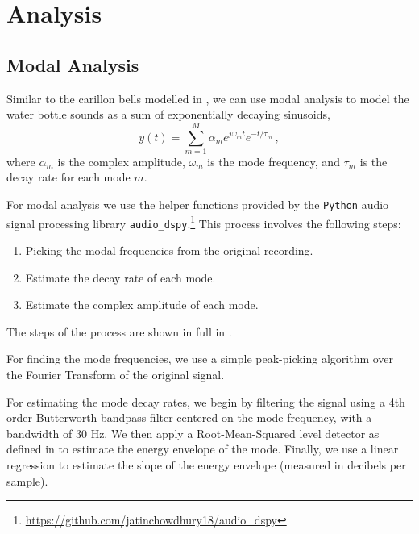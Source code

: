 \documentclass[twoside,a4paper]{article}
\begin{document}
%
%



\section{Analysis} \label{sec:analysis}


\subsection{Modal Analysis} \label{sec:modal-analysis}
%
Similar to the carillon bells modelled in \cite{canfielddafilou:werner:bellEffects:2017,rau:das:canfielddafilou:carillon:2019},
we can use modal analysis to model the water bottle sounds as
a sum of exponentially decaying sinusoids,
\begin{equation}
    y(t) = \sum_{m=1}^M \alpha_m e^{j\omega_m t} e^{-t/\tau_m} \,,
    \label{eq:modal-def}
\end{equation}
%
where $\alpha_m$ is the complex amplitude, $\omega_m$ is the mode
frequency, and $\tau_m$ is the decay rate for each mode $m$.

For modal analysis we use the helper functions
provided by the \texttt{Python} audio signal processing library
\texttt{audio\_dspy}.\footnote{\url{https://github.com/jatinchowdhury18/audio_dspy}}
This process involves the following steps:
\begin{enumerate}
    \item Picking the modal frequencies from the original recording.
    \item Estimate the decay rate of each mode.
    \item Estimate the complex amplitude of each mode.
\end{enumerate}
%
The steps of the process are shown in  full in .

For finding the mode frequencies, we use a simple peak-picking
algorithm over the Fourier Transform of the original signal.

For estimating the mode decay rates, we begin by filtering
the signal using a 4th order Butterworth bandpass filter
centered on the mode frequency, with a bandwidth of 30 Hz.
We then apply a Root-Mean-Squared level detector as defined
in \cite{giannoulis2012compressor} to estimate the energy
envelope of the mode. Finally, we use a linear regression
to estimate the slope of the energy envelope (measured in
decibels per sample).
\end{document}
